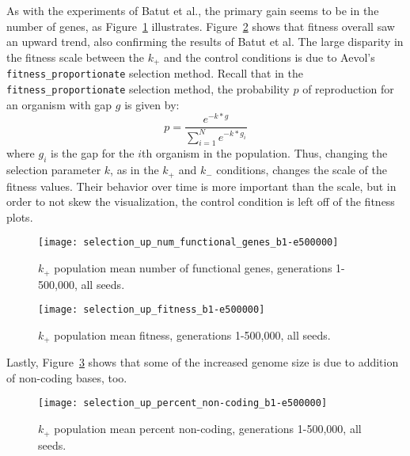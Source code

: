 As with the experiments of Batut et al., the primary gain seems to be in the number of genes, as Figure~\ref{fig:selection_up_num_functional_genes} illustrates. Figure~\ref{fig:selection_up_fitness} shows that fitness overall saw an upward trend, also confirming the results of Batut et al. The large disparity in the fitness scale between the $k_+$ and the control conditions is due to Aevol's \texttt{fitness\_proportionate} selection method. Recall that in the \texttt{fitness\_proportionate} selection method, the probability $p$ of reproduction for an organism with gap $g$ is given by:
\begin{equation*}
p = \frac{e^{-k*g}}{\sum_{i=1}^{N}e^{-k*g_i}}
\end{equation*}
where $g_i$ is the gap for the $i$th organism in the population. Thus, changing the selection parameter $k$, as in the $k_+$ and $k_-$ conditions, changes the scale of the fitness values. Their behavior over time is more important than the scale, but in order to not skew the visualization, the control condition is left off of the fitness plots.

\begin{figure}[h]
	\centering
	\texttt{[image: selection\_up\_num\_functional\_genes\_b1-e500000]}
	\caption[Selection up number of functional genes]{$k_+$ population mean number of functional genes, generations 1-500,000, all seeds.}
	\label{fig:selection_up_num_functional_genes}
\end{figure}

\begin{figure}[h]
	\centering
	\texttt{[image: selection\_up\_fitness\_b1-e500000]}
	\caption[Selection up fitness]{$k_+$ population mean fitness, generations 1-500,000, all seeds.}
	\label{fig:selection_up_fitness}
\end{figure}

Lastly, Figure~\ref{fig:selection_up_perc_non-coding} shows that some of the increased genome size is due to addition of non-coding bases, too. 

\begin{figure}[h]
	\centering
	\texttt{[image: selection\_up\_percent\_non-coding\_b1-e500000]}
	\caption[Selection up percent non-coding]{$k_+$ population mean percent non-coding, generations 1-500,000, all seeds.}
	\label{fig:selection_up_perc_non-coding}
\end{figure}
